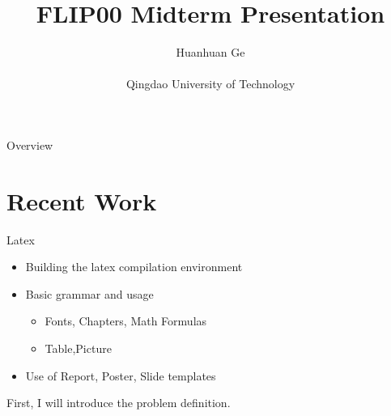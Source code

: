 \documentclass[
 size=12pt,
 paper=smartboard,  %
 mode=present, 		%
 display=slides, 	%
 style=tuliplab,  	%
 pauseslide,
 fleqn,leqno]{powerdot}
\title{FLIP00 Midterm Presentation}
\author{
Huanhuan Ge
\\
\\Qingdao University of Technology
}
\date{\gitCommitterDate}
\begin{document}
\maketitle


\begin{slide}[toc=,bm=]{Overview}
\begin{spacing}{1.00}
\tableofcontents[content=currentsection,type=1]
\end{spacing}
\end{slide}


\section{Recent Work}


\begin{slide}{Latex}
\begin{center}
\begin{itemize}
  \item
  Building the latex compilation environment
  \item
  Basic grammar and usage
  \begin{itemize}
    \item
    Fonts, Chapters, Math Formulas
    \item
    Table,Picture
  \end{itemize}
  \item
  Use of Report, Poster, Slide templates  
\end{itemize}
\end{center}
\begin{note}
First, I will introduce the problem definition.
\end{note}

\end{slide}


\end{document}
